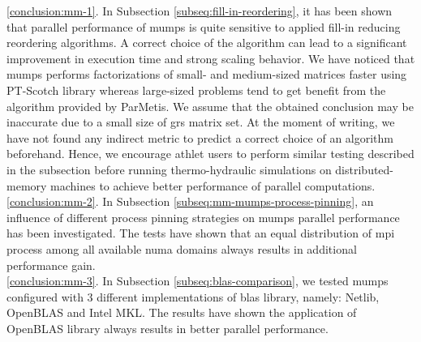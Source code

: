 \ref{conclusion:mm-1}. In Subsection \ref{subseq:fill-in-reordering}, it has been shown that parallel performance of \acrshort{mumps} is quite sensitive to applied fill-in reducing reordering algorithms. A correct choice of the algorithm can lead to a significant improvement in execution time and strong scaling behavior. We have noticed that \acrshort{mumps} performs factorizations of small- and medium-sized matrices faster using PT-Scotch library whereas large-sized problems tend to get benefit from the algorithm provided by ParMetis. We assume that the obtained conclusion may be inaccurate due to a small size of \acrshort{grs} matrix set. At the moment of writing, we have not found any indirect metric to predict a correct choice of an algorithm beforehand. Hence, we encourage \acrshort{athlet} users to perform similar testing described in the subsection before running thermo-hydraulic simulations on distributed-memory machines to achieve better performance of parallel computations.\\




\ref{conclusion:mm-2}. In Subsection \ref{subseq:mm-mumps-process-pinning}, an influence of different process pinning strategies on \acrshort{mumps} parallel performance has been investigated. The tests have shown that an equal distribution of \acrshort{mpi} process among all available \acrshort{numa} domains always results in additional performance gain.\\ %


\ref{conclusion:mm-3}. 
In Subsection \ref{subseq:blas-comparison},
we tested \acrshort{mumps} configured with 3 different implementations of \acrshort{blas} library, namely: Netlib, OpenBLAS and Intel MKL. The results have shown the application of OpenBLAS library always results in better parallel performance.\\




